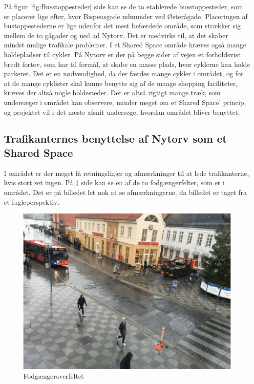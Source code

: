 På figur \cref{fig:Busstoppesteder} side \pageref{fig:Busstoppesteder} kan se de to etablerede busstoppesteder, som er placeret lige efter, hvor Bispensgade udmunder ved Østerågade. Placeringen af bustoppestederne er lige udenfor det mest befærdede område, som strækker sig mellem de to gågader og ned ad Nytorv. Det er medvirke til, at det skaber mindst mulige trafikale problemer.
I et Shared Space område kræves også mange holdepladser til cykler. På Nytorv er der på begge sider af vejen et forholdsvist bredt fortov, som har til formål, at skabe en masse plads, hvor cyklerne kan holde parkeret. Det er en nødvendighed, da der færdes mange cykler i området, og for at de mange cyklister skal kunne benytte sig af de mange shopping faciliteter, kræves der altså nogle holdesteder.
Der er altså rigtigt mange træk, som undersæger i området kan observere, minder meget om et Shared Space’ princip, og projektet vil i det næste afsnit undersøge, hvordan området bliver benyttet.


\subsection{Trafikanternes benyttelse af Nytorv som et Shared Space}
\label{benyttelse_omrade}
I området er der meget få retningslinjer og afmærkninger til at lede trafikanterne, hvis stort set ingen. På \cref{fig:Fodfelt} side \pageref{fig:Fodfelt} kan se en af de to fodgængerfelter, som er i området. Det er på billedet let nok at se afmærkningerne, da billedet er taget fra et fugleperspektiv.

\begin{figure}[htbp]
   \centering
   \begin{adjustbox}{max width=\textwidth}
     \includegraphics[scale=0.3]{figures/Billederogfigur/Fodfelt.jpg}
  \end{adjustbox}
   \caption{Fodgængeroverfeltet}
   \label{fig:Fodfelt}
 \end{figure}

